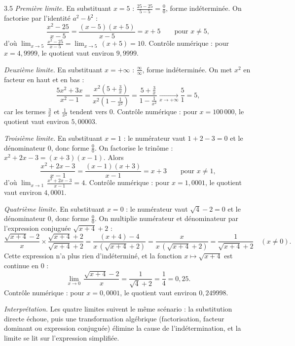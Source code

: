 \begin{corrige}{3.5}
\emph{Première limite.} En substituant $x = 5$ : $\frac{25 - 25}{5 - 5} = \frac{0}{0}$, forme indéterminée. On factorise par l'identité $a^{2} - b^{2}$ :
\[
\frac{x^{2} - 25}{x - 5} = \frac{(x-5)(x+5)}{x-5} = x + 5 \qquad \text{pour } x \neq 5,
\]
d'où $\displaystyle\lim_{x \to 5}\,\frac{x^{2} - 25}{x - 5} = \lim_{x \to 5}\,(x + 5) = 10$. Contrôle numérique : pour $x = 4{,}9999$, le quotient vaut environ $9{,}9999$.

\emph{Deuxième limite.} En substituant $x = +\infty$ : $\frac{\infty}{\infty}$, forme indéterminée. On met $x^{2}$ en facteur en haut et en bas :
\[
\frac{5x^{2} + 3x}{x^{2} - 1} = \frac{x^{2}\left(5 + \frac{3}{x}\right)}{x^{2}\left(1 - \frac{1}{x^{2}}\right)} = \frac{5 + \frac{3}{x}}{1 - \frac{1}{x^{2}}} \xrightarrow[x \to +\infty]{} \frac{5}{1} = 5,
\]
car les termes $\frac{3}{x}$ et $\frac{1}{x^{2}}$ tendent vers $0$. Contrôle numérique : pour $x = 100\,000$, le quotient vaut environ $5{,}00003$.

\emph{Troisième limite.} En substituant $x = 1$ : le numérateur vaut $1 + 2 - 3 = 0$ et le dénominateur $0$, donc forme $\frac{0}{0}$. On factorise le trinôme : $x^{2} + 2x - 3 = (x+3)(x-1)$. Alors
\[
\frac{x^{2} + 2x - 3}{x - 1} = \frac{(x-1)(x+3)}{x-1} = x + 3 \qquad \text{pour } x \neq 1,
\]
d'où $\displaystyle\lim_{x \to 1}\,\frac{x^{2} + 2x - 3}{x - 1} = 4$. Contrôle numérique : pour $x = 1{,}0001$, le quotient vaut environ $4{,}0001$.

\emph{Quatrième limite.} En substituant $x = 0$ : le numérateur vaut $\sqrt{4} - 2 = 0$ et le dénominateur $0$, donc forme $\frac{0}{0}$. On multiplie numérateur et dénominateur par l'expression conjuguée $\sqrt{x+4} + 2$ :
\[
\frac{\sqrt{x+4} - 2}{x} \times \frac{\sqrt{x+4} + 2}{\sqrt{x+4} + 2} = \frac{(x+4) - 4}{x\,(\sqrt{x+4} + 2)} = \frac{x}{x\,(\sqrt{x+4} + 2)} = \frac{1}{\sqrt{x+4} + 2} \quad (x \neq 0).
\]
Cette expression n'a plus rien d'indéterminé, et la fonction $x \mapsto \sqrt{x+4}$ est continue en $0$ :
\[
\lim_{x \to 0}\,\frac{\sqrt{x+4} - 2}{x} = \frac{1}{\sqrt{4} + 2} = \frac{1}{4} = 0{,}25.
\]
Contrôle numérique : pour $x = 0{,}0001$, le quotient vaut environ $0{,}249998$.

\emph{Interprétation.} Les quatre limites suivent le même scénario : la substitution directe échoue, puis une transformation algébrique (factorisation, facteur dominant ou expression conjuguée) élimine la cause de l'indétermination, et la limite se lit sur l'expression simplifiée.
\end{corrige}

